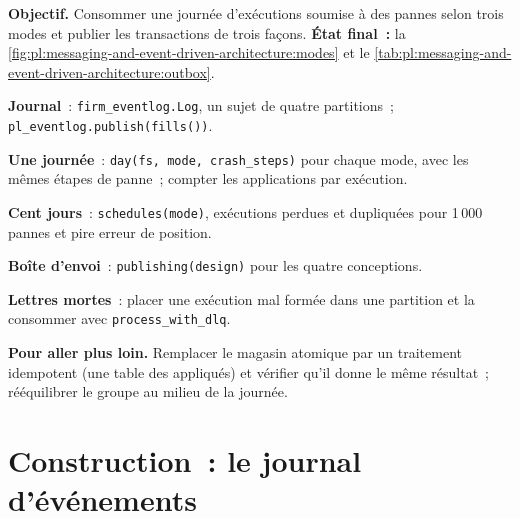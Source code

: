 \begin{tutorial}
\textbf{Objectif.} Consommer une journée d'exécutions soumise à des pannes selon trois modes et publier les transactions de trois façons. \textbf{État final~:}
la \cref{fig:pl:messaging-and-event-driven-architecture:modes} et le \cref{tab:pl:messaging-and-event-driven-architecture:outbox}.
\begin{tutsteps}
\item \textbf{Journal}~: \texttt{firm\_eventlog.Log}, un sujet de quatre partitions~; \texttt{pl\_eventlog.publish(fills())}.
\item \textbf{Une journée}~: \texttt{day(fs, mode, crash\_steps)} pour chaque mode, avec les mêmes étapes de panne~; compter les applications par exécution.
\item \textbf{Cent jours}~: \texttt{schedules(mode)}, exécutions perdues et dupliquées pour 1\,000 pannes et pire erreur de position.
\item \textbf{Boîte d'envoi}~: \texttt{publishing(design)} pour les quatre conceptions.
\item \textbf{Lettres mortes}~: placer une exécution mal formée dans une partition et la consommer avec \texttt{process\_with\_dlq}.
\end{tutsteps}
\textbf{Pour aller plus loin.} Remplacer le magasin atomique par un traitement idempotent (une table des  appliqués) et vérifier qu'il donne le
même résultat~; rééquilibrer le groupe au milieu de la journée.
\end{tutorial}

\section{Construction~: le journal d'événements}\label{bld:pl:messaging-and-event-driven-architecture:eventlog}

